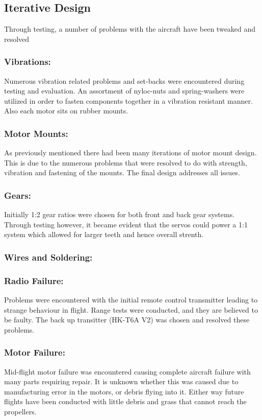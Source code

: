 \subsection{Iterative Design}
Through testing, a number of problems with the aircraft have been tweaked and resolved

\subsubsection*{Vibrations:} Numerous vibration related problems and set-backs were encountered during testing and evaluation. An assortment of nyloc-nuts and spring-washers were utilized in order to fasten components together in a vibration resistant manner. Also each motor sits on rubber mounts.
\subsubsection*{Motor Mounts:} As previously mentioned there had been many iterations of motor mount design. This is due to the numerous problems that were resolved to do with strength, vibration and fastening of the mounts. The final design addresses all issues.
\subsubsection*{Gears:} Initially 1:2 gear ratios were chosen for both front and back gear systems. Through testing however, it became evident that the servos could power a 1:1 system which allowed for larger teeth and hence overall strenth.
\subsubsection*{Wires and Soldering:}  
\subsubsection*{Radio Failure:} Problems were encountered with the initial remote control  transmitter leading to strange behaviour in flight. Range tests were conducted, and they are believed to be faulty. The back up transitter (HK-T6A V2) was chosen and resolved these problems.
\subsubsection*{Motor Failure:} Mid-flight motor failure was encountered causing complete aircraft failure with many parts requiring repair. It is unknown whether this was caused due to manufacturing error in the motors, or debris flying into it. Either way future flights have been conducted with little debris and grass that cannot reach the propellers. 
